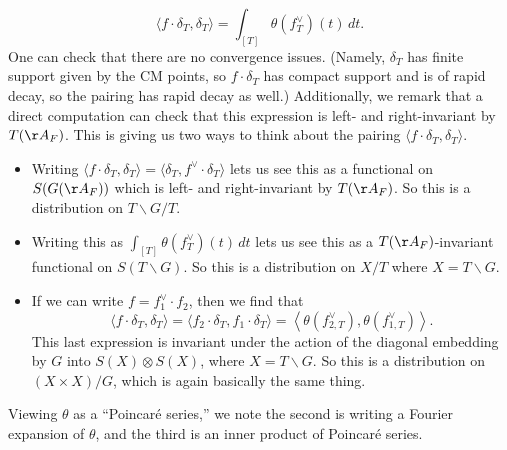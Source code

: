 \documentclass[../notes.tex]{subfiles}
\begin{document}
\[\langle f\cdot\delta_T,\delta_T\rangle=\int_{[T]}\theta\left(f_T^\lor\right)(t)\,dt.\]
One can check that there are no convergence issues. (Namely, $\delta_T$ has finite support given by the CM points, so $f\cdot\delta_T$ has compact support and is of rapid decay, so the pairing has rapid decay as well.) Additionally, we remark that a direct computation can check that this expression is left- and right-invariant by $T(\AA_F)$. This is giving us two ways to think about the pairing $\langle f\cdot\delta_T,\delta_T\rangle$.
\begin{itemize}
	\item Writing $\langle f\cdot\delta_T,\delta_T\rangle=\langle\delta_T,f^\lor\cdot\delta_T\rangle$ lets us see this as a functional on $S(G(\AA_F))$ which is left- and right-invariant by $T(\AA_F)$. So this is a distribution on $T\backslash G/T$.
	\item Writing this as $\int_{[T]}\theta(f_T^\lor)(t)\,dt$ lets us see this as a $T(\AA_F)$-invariant functional on $S(T\backslash G)$. So this is a distribution on $X/T$ where $X=T\backslash G$.
	\item If we can write $f=f_1^\lor\cdot f_2$, then we find that
	\[\langle f\cdot\delta_T,\delta_T\rangle=\langle f_2\cdot\delta_T,f_1\cdot\delta_T\rangle=\left\langle\theta(f_{2,T}^\lor),\theta(f_{1,T}^\lor)\right\rangle.\]
	This last expression is invariant under the action of the diagonal embedding by $G$ into $S(X)\otimes S(X)$, where $X=T\backslash G$. So this is a distribution on $(X\times X)/G$, which is again basically the same thing.
\end{itemize}
Viewing $\theta$ as a ``Poincar\'e series,'' we note the second is writing a Fourier expansion of $\theta$, and the third is an inner product of Poincar\'e series.
\end{document}
